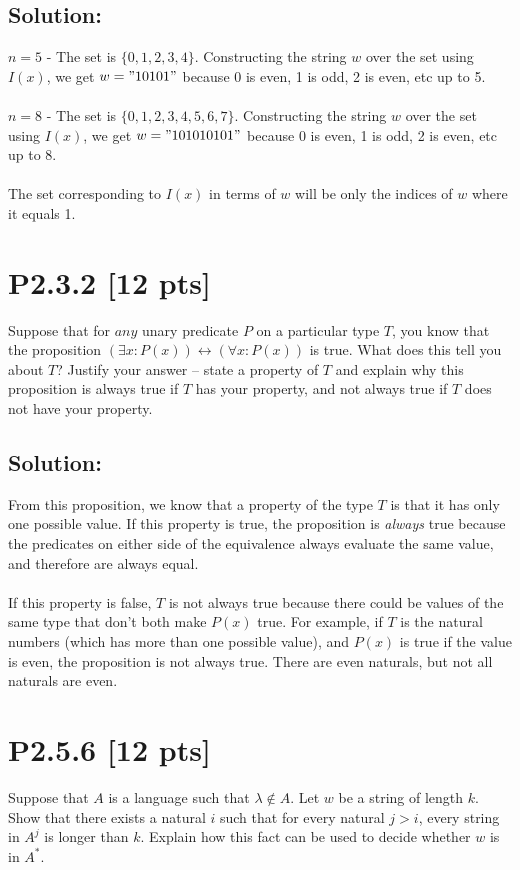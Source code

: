 \documentclass[12pt]{article}
\begin{document}
\subsection*{\textbf{Solution:}}
$n = 5$ - The set is $\{0, 1, 2, 3, 4\}$. Constructing the string $w$ over the set using $I(x)$, we get $w = "10101"$ because 0 is even, 1 is odd, 2 is even, etc up to 5. \\\\
$n = 8$ - The set is $\{0, 1, 2, 3, 4, 5, 6, 7\}$. Constructing the string $w$ over the set using $I(x)$, we get $w = "101010101"$ because 0 is even, 1 is odd, 2 is even, etc up to 8. \\\\
The set corresponding to $I(x)$ in terms of $w$ will be only the indices of $w$ where it equals 1.



\newpage
\section*{\textbf{P2.3.2} [12 pts]}
Suppose that for $any$ unary predicate $P$ on a particular type $T$, you know that the proposition $(\exists x : P(x)) \leftrightarrow (\forall x : P(x))$ is true. What does this tell you about $T$? Justify your answer – state a property of $T$ and explain why this proposition is always true if $T$ has your property, and not always true if $T$ does not have your property.


\subsection*{\textbf{Solution:}}
From this proposition, we know that a property of the type $T$ is that it has only one possible value. If this property is true, the proposition is \textit{always} true because the predicates on either side of the equivalence always evaluate the same value, and therefore are always equal.\\\\
If this property is false, $T$ is not always true because there could be values of the same type that don't both make $P(x)$ true. For example, if $T$ is the natural numbers (which has more than one possible value), and $P(x)$ is true if the value is even, the proposition is not always true. There are even naturals, but not all naturals are even.


\newpage
\section*{\textbf{P2.5.6} [12 pts]}
Suppose that $A$ is a language such that $\lambda \notin A$. Let $w$ be a string of length $k$. Show that there exists a natural $i$ such that for every natural $j > i$, every string in $A^j$ is longer than $k$. Explain how this fact can be used to decide whether $w$ is in $A^*$.
\end{document}
